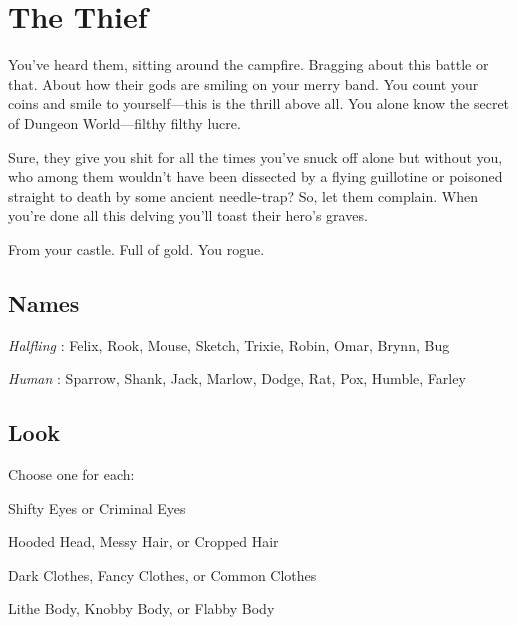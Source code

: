 \chapter{The Thief}
  
 





You’ve heard them, sitting around the campfire. Bragging about this battle or that. About how their gods are smiling on your merry band. You count your coins and smile to yourself—this is the thrill above all. You alone know the secret of Dungeon World—filthy filthy lucre.

  

Sure, they give you shit for all the times you’ve snuck off alone but without you, who among them wouldn’t have been dissected by a flying guillotine or poisoned straight to death by some ancient needle-trap? So, let them complain. When you’re done all this delving you’ll toast their hero’s graves.

 

From your castle. Full of gold. You rogue.



 
\section{Names}   
 



{\em Halfling} : Felix, Rook, Mouse, Sketch, Trixie, Robin, Omar, Brynn, Bug

 

{\em Human} : Sparrow, Shank, Jack, Marlow, Dodge, Rat, Pox, Humble, Farley



 
\section{Look}  
 



Choose one for each:

 

Shifty Eyes or Criminal Eyes

 

Hooded Head, Messy Hair, or Cropped Hair

 

Dark Clothes, Fancy Clothes, or Common Clothes

 

Lithe Body, Knobby Body, or Flabby Body



